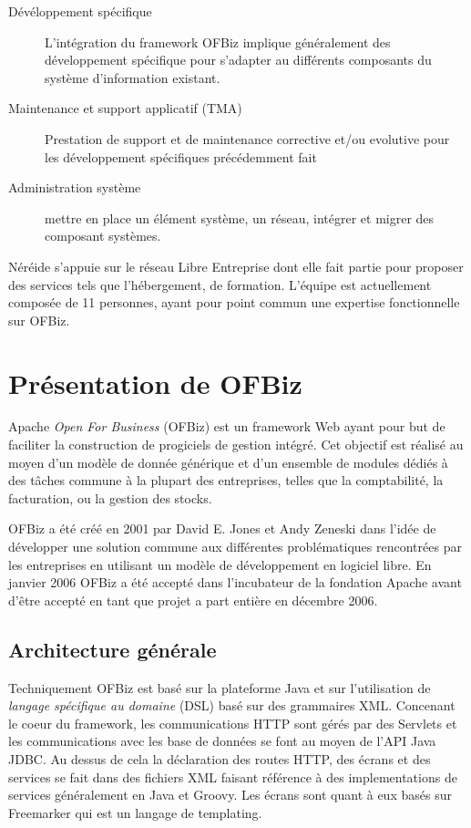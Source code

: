 \documentclass[a4paper, 11pt]{report}
\begin{document}
\begin{description}
\item[Dévéloppement spécifique] L'intégration du framework OFBiz
  implique généralement des développement spécifique pour s'adapter au
  différents composants du système d'information existant.
\item[Maintenance et support applicatif (TMA)] Prestation de support
  et de maintenance corrective et/ou evolutive pour les développement
  spécifiques précédemment fait
\item[Administration système] mettre en place un élément système, un
  réseau, intégrer et migrer des composant systèmes.
\end{description}

Néréide s'appuie sur le réseau Libre Entreprise dont elle fait partie
pour proposer des services tels que l'hébergement, de formation.
L'équipe est actuellement composée de 11 personnes, ayant pour point
commun une expertise fonctionnelle sur OFBiz.

\chapter{Présentation de OFBiz}

Apache \emph{Open For Business} (OFBiz) est un framework Web ayant
pour but de faciliter la construction de progiciels de gestion
intégré.  Cet objectif est réalisé au moyen d'un modèle de donnée
générique et d'un ensemble de modules dédiés à des tâches commune à la
plupart des entreprises, telles que la comptabilité, la facturation,
ou la gestion des stocks.

OFBiz a été créé en 2001 par David E. Jones et Andy Zeneski dans
l'idée de développer une solution commune aux différentes
problématiques rencontrées par les entreprises en utilisant un modèle
de développement en logiciel libre. En janvier 2006 OFBiz a été accepté
dans l'incubateur de la fondation Apache avant d'être accepté en tant
que projet a part entière en décembre 2006.

\section{Architecture générale}

Techniquement OFBiz est basé sur la plateforme Java et sur
l'utilisation de \emph{langage spécifique au domaine} (DSL) basé sur
des grammaires XML.  Concenant le coeur du framework, les
communications HTTP sont gérés par des Servlets \cite{Chan2017servlet}
et les communications avec les base de données se font au moyen de
l'API Java JDBC.  Au dessus de cela la déclaration des routes HTTP,
des écrans et des services se fait dans des fichiers XML faisant
référence à des implementations de services généralement en Java et
Groovy.  Les écrans sont quant à eux basés sur Freemarker qui est un
langage de templating.
\end{document}
